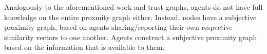 \documentclass[11pt,a4paper]{article}
\theoremstyle{definition}
\newtheorem{definition}{Definition}[section]
\theoremstyle{theorem}
\theoremstyle{proposition}
\theoremstyle{corollary}
\theoremstyle{lemma}
\theoremstyle{example}
\theoremstyle{remark}
\begin{document}

\noindent{}Analogously to the aforementioned work and trust graphs, agents do not have full knowledge on the entire proxmity graph either. Instead, nodes have a subjective proximity graph, based on agents sharing/reporting their own respective similarity vectors to one another. Agents construct a subjective proximity graph based on the information that is available to them. \vspace{1em}\\
\end{document}
